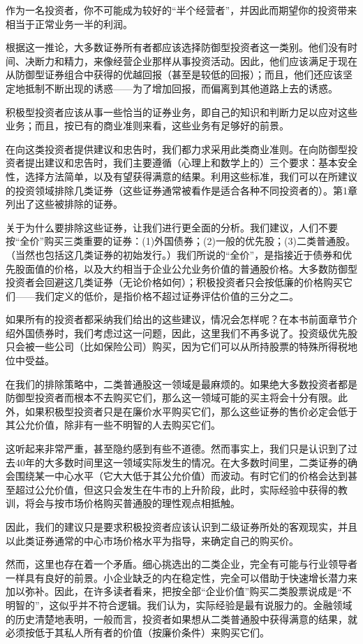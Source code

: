 \documentclass[12pt,oneside]{book}
\begin{document}
作为一名投资者，你不可能成为较好的“半个经营者”，并因此而期望你的投资带来相当于正常业务一半的利润。

根据这一推论，大多数证券所有者都应该选择防御型投资者这一类别。他们没有时间、决断力和精力，来像经营企业那样从事投资活动。因此，他们应该满足于现在从防御型证券组合中获得的优越回报（甚至是较低的回报）；而且，他们还应该坚定地抵制不断出现的诱惑——为了增加回报，而偏离到其他道路上去的诱惑。

积极型投资者应该从事一些恰当的证券业务，即自己的知识和判断力足以应对这些业务；而且，按已有的商业准则来看，这些业务有足够好的前景。

在向这类投资者提供建议和忠告时，我们都力求采用此类商业准则。在向防御型投资者提出建议和忠告时，我们主要遵循（心理上和数学上的）三个要求：基本安全性，选择方法简单，以及有望获得满意的结果。利用这些标准，我们可以在所建议的投资领域排除几类证券（这些证券通常被看作是适合各种不同投资者的）。第1章列出了这些被排除的证券。

关于为什么要排除这些证券，让我们进行更全面的分析。我们建议，人们不要按“全价”购买三类重要的证券：(1)外国债券；(2)一般的优先股；(3)二类普通股。（当然也包括这几类证券的初始发行。）我们所说的“全价”，是指接近于债券和优先股面值的价格，以及大约相当于企业公允业务价值的普通股价格。大多数防御型投资者会回避这几类证券（无论价格如何）；积极投资者只会按低廉的价格购买它们——我们定义的低价，是指价格不超过证券评估价值的三分之二。

如果所有的投资者都采纳我们给出的这些建议，情况会怎样呢？在本书前面章节介绍外国债券时，我们考虑过这一问题，因此，这里我们不再多说了。投资级优先股只会被一些公司（比如保险公司）购买，因为它们可以从所持股票的特殊所得税地位中受益。

在我们的排除策略中，二类普通股这一领域是最麻烦的。如果绝大多数投资者都是防御型投资者而根本不去购买它们，那么这一领域可能的买主将会十分有限。此外，如果积极型投资者只是在廉价水平购买它们，那么这些证券的售价必定会低于其公允价值，除非有一些不明智的人去购买它们。

这听起来非常严重，甚至隐约感到有些不道德。然而事实上，我们只是认识到了过去40年的大多数时间里这一领域实际发生的情况。在大多数时间里，二类证券的确会围绕某一中心水平（它大大低于其公允价值）而波动。有时它们的价格会达到甚至超过公允价值，但这只会发生在牛市的上升阶段，此时，实际经验中获得的教训，将会与按市场价格购买普通股的理性观点相抵触。

因此，我们的建议只是要求积极投资者应该认识到二级证券所处的客观现实，并且以此类证券通常的中心市场价格水平为指导，来确定自己的购买价。

然而，这里也存在着一个矛盾。细心挑选出的二类企业，完全有可能与行业领导者一样具有良好的前景。小企业缺乏的内在稳定性，完全可以借助于快速增长潜力来加以弥补。因此，在许多读者看来，把按全部“企业价值”购买二类股票说成是“不明智的”，这似乎并不符合逻辑。我们认为，实际经验是最有说服力的。金融领域的历史清楚地表明，一般而言，投资者如果想从二类普通股中获得满意的结果，就必须按低于其私人所有者的价值（按廉价条件）来购买它们。
\end{document}
